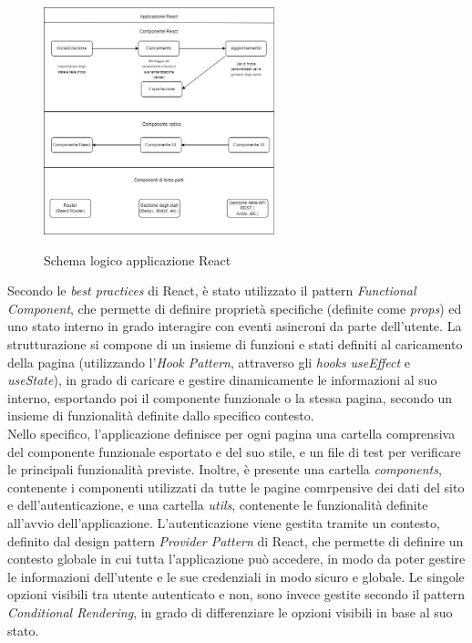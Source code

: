 \begin{figure}[h]
    \centering
    \includegraphics[width=0.6\textwidth, alt={Descrizione dello schema logico di un'applicazione React}]{immagini/react.jpeg}
    \caption{Schema logico applicazione React} \label{fig:react}
\end{figure}

\newpage

Secondo le \textit{best practices} di React, è stato utilizzato il pattern \textit{Functional Component}, che permette di definire proprietà specifiche (definite come \textit{props})
ed uno stato interno in grado interagire con eventi asincroni da parte dell'utente. La strutturazione si compone di un insieme di funzioni e stati definiti
al caricamento della pagina (utilizzando l'\textit{Hook Pattern}, attraverso gli \textit{hooks} \textit{useEffect} e \textit{useState}), in grado di caricare e gestire dinamicamente le informazioni
al suo interno, esportando poi il componente funzionale o la stessa pagina, secondo un insieme di funzionalità definite dallo specifico contesto. \\

Nello specifico, l'applicazione definisce per ogni pagina una cartella comprensiva del componente funzionale
esportato e del suo stile, e un file di test per verificare le principali funzionalità previste.
Inoltre, è presente una cartella \textit{components}, contenente i componenti utilizzati da tutte le pagine comrpensive dei dati del sito e dell'autenticazione, e
una cartella \textit{utils}, contenente le funzionalità definite all'avvio dell'applicazione.
L'autenticazione viene gestita tramite un contesto, definito dal design pattern \textit{Provider Pattern} di React, che permette di definire un contesto globale
in cui tutta l'applicazione può accedere, in modo da poter gestire le informazioni dell'utente e le sue credenziali in modo sicuro e globale. 
Le singole opzioni visibili tra utente autenticato e non, sono invece gestite secondo il pattern \textit{Conditional Rendering}, in grado di differenziare le opzioni
visibili in base al suo stato. 


